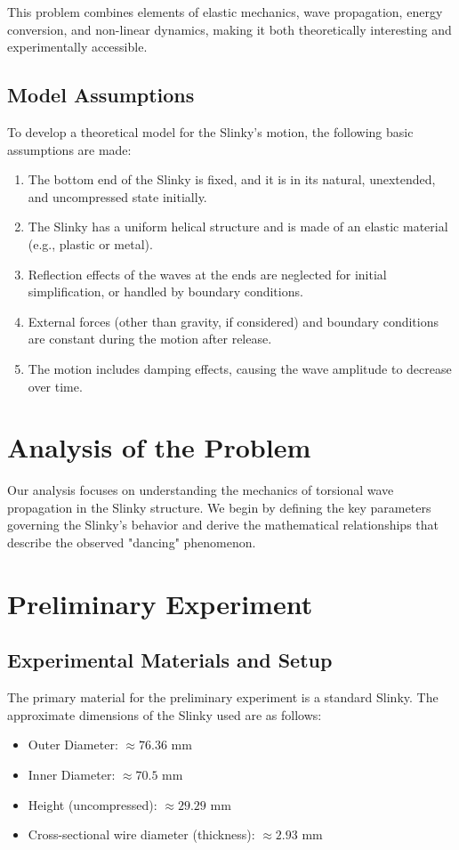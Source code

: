 \documentclass{mcmthesis}  %
\begin{document}
This problem combines elements of elastic mechanics, wave propagation, energy conversion, and non-linear dynamics, making it both theoretically interesting and experimentally accessible.

\subsection{Model Assumptions}  %
To develop a theoretical model for the Slinky's motion, the following basic assumptions are made:
\begin{enumerate}
\item The bottom end of the Slinky is fixed, and it is in its natural, unextended, and uncompressed state initially.
\item The Slinky has a uniform helical structure and is made of an elastic material (e.g., plastic or metal).
\item Reflection effects of the waves at the ends are neglected for initial simplification, or handled by boundary conditions.
\item External forces (other than gravity, if considered) and boundary conditions are constant during the motion after release.
\item The motion includes damping effects, causing the wave amplitude to decrease over time.
\end{enumerate}

\section{Analysis of the Problem}  %

Our analysis focuses on understanding the mechanics of torsional wave propagation in the Slinky structure. We begin by defining the key parameters governing the Slinky's behavior and derive the mathematical relationships that describe the observed "dancing" phenomenon.

\section{Preliminary Experiment} %

\subsection{Experimental Materials and Setup} %
The primary material for the preliminary experiment is a standard Slinky. The approximate dimensions of the Slinky used are as follows:
\begin{itemize}
    \item Outer Diameter: \(\approx 76.36\) mm
    \item Inner Diameter: \(\approx 70.5\) mm
    \item Height (uncompressed): \(\approx 29.29\) mm
    \item Cross-sectional wire diameter (thickness): \(\approx 2.93\) mm
\end{itemize}
\end{document}
